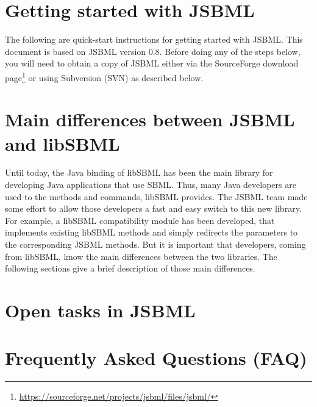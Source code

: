 \documentclass[
  BCOR12mm,
  letterpaper,
  11pt,
  headsepline,
  pointlessnumbers,
  tablecaptionabove,
  onelinecaption,
  headinclude,
  appendixprefix,
  idxtotoc,
  bibtotoc,
  twoside,
  titlepage
]{scrreprt}
\begin{document}
\tableofcontents

\chapter{Getting started with JSBML}

The following are quick-start instructions for getting started with JSBML. This
document is based on JSBML version 0.8. Before doing any of the steps below,
you will need to obtain a copy of JSBML either via the SourceForge download
page\footnote{\url{https://sourceforge.net/projects/jsbml/files/jsbml/}} or using
Subversion (SVN) as described below.





\chapter{Main differences between JSBML and libSBML}

Until today, the Java binding of libSBML has been the main library for
developing Java applications that use SBML. Thus, many Java developers are used
to the methods and commands, libSBML provides. The JSBML team made some effort
to allow those developers a fast and easy switch to this new library. For
example, a libSBML compatibility module has been developed, that implements
existing libSBML methods and simply redirects the parameters to the
corresponding JSBML methods. But it is important that developers, coming from
libSBML, know the main differences between the two libraries. The following
sections give a brief description of those main differences.



\chapter{Open tasks in JSBML}



\appendix

\chapter{Frequently Asked Questions (FAQ)}







\printindex
\end{document}
